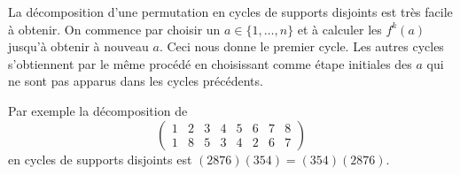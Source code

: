 \documentclass[french,course,oneside,theoremnosection]{lecture}
\newcommand{\Z}{\mathbb{Z}}
\newcommand{\supp}{\mathrm{supp}}
\newcommand{\ppcm}{\mathrm{ppcm}}
\begin{document}
\begin{example}
La décomposition d'une permutation en cycles de supports disjoints est très facile à obtenir. On commence par choisir un $a\in \{1, \ldots, n\}$ et à calculer les $f^k(a)$ jusqu'à obtenir à nouveau $a$. Ceci nous donne le premier cycle. Les autres cycles s'obtiennent par le même procédé en choisissant comme étape initiales des $a$ qui ne sont pas apparus dans les cycles précédents.

Par exemple la décomposition de 
\[
\begin{pmatrix}
1 & 2 & 3 & 4 & 5 & 6 & 7 & 8\\
1 & 8 & 5 & 3 & 4 & 2 & 6 & 7
\end{pmatrix}
\]
en cycles de supports disjoints est $(2876)(354)=(354)(2876)$.
\end{example}

%
\end{document}
